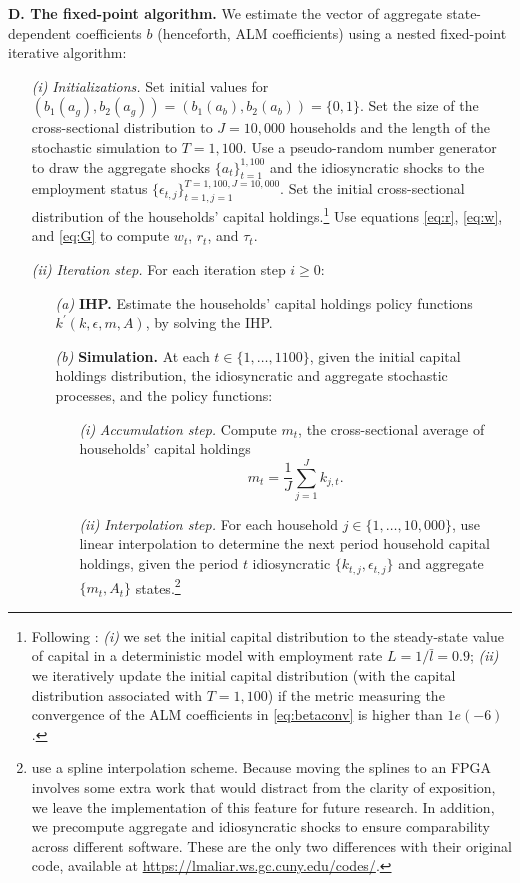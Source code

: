 \documentclass[12pt,american]{article}
\newcommand{\kopt}{k^{\prime}}
\newcommand{\lbar}{\bar{l}}
\newcommand{\state}{k,\epsilon,m,A}
\begin{document}
\textbf{D. The fixed-point algorithm.} We estimate the vector of aggregate state-dependent coefficients $b$ (henceforth, ALM coefficients) using a nested fixed-point iterative algorithm:
\begin{itemize}
\item [\textit{(i)}] \textit{Initializations.} Set initial values for $(b_1(a_g),b_{2}(a_g))=(b_1(a_b),b_{2}(a_b))=\{0,1\}$. Set the size of the cross-sectional distribution to $J=10,000$ households and the length of the stochastic simulation to $T=1,100$. Use a pseudo-random number generator to draw the aggregate shocks $\{a_t\}_{t=1}^{1,100}$ and the idiosyncratic shocks to the employment status $\{\epsilon_{t,j}\}_{t=1,j=1}^{T=1,100,J=10,000}$. Set the initial cross-sectional distribution of the households' capital holdings.\footnote{Following \citet{MaliarMaliarValli2010}: \textit{(i)} we set the initial capital distribution to the steady-state value of capital in a deterministic model with employment rate $L =1/\lbar=0.9$; \textit{(ii)} we iteratively update the initial capital distribution (with the capital distribution associated with $T=1,100$) if the metric measuring the convergence of the ALM coefficients in \eqref{eq:betaconv} is higher than $1e(-6)$.} Use equations \eqref{eq:r}, \eqref{eq:w}, and \eqref{eq:G} to compute $w_t$, $r_t$, and $\tau_t$.

\item [\textit{(ii)}] \textit{Iteration step.} For each iteration step $i\geq 0$:
\begin{itemize}
\item [\textit{(a)}] \textbf{IHP.} Estimate the households' capital holdings policy functions $\kopt(\state)$, by solving the IHP.
\item [\textit{(b)}] \textbf{Simulation.} At each $t\in\{1,\ldots,1100\}$, given the initial capital holdings distribution, the idiosyncratic and aggregate stochastic processes, and the policy functions:
\begin{itemize}
\item [\textit{(i)}] \textit{Accumulation step.} Compute $m_t$, the cross-sectional average of households' capital holdings 
\begin{equation}\label{eq:Kagg}
m_{t} = \frac{1}{J}\sum_{j=1}^{J}k_{j,t}.
\end{equation}
\item [\textit{(ii)}] \textit{Interpolation step.} For each household $j\in\{1,\ldots,10,000\}$, use linear interpolation to determine the next period household capital holdings, given the period $t$ idiosyncratic $\{k_{t,j},\epsilon_{t,j}\}$ and aggregate $\{m_t,A_t\}$ states.\footnote{\citet{MaliarMaliarValli2010} use a spline interpolation scheme. Because moving the splines to an FPGA involves some extra work that would distract from the clarity of exposition, we leave the implementation of this feature for future research. In addition, we precompute aggregate and idiosyncratic shocks to ensure comparability across different software. These are the only two differences with their original code, available at \url{https://lmaliar.ws.gc.cuny.edu/codes/}.} 
\end{itemize}


\end{itemize}
\end{itemize}
\end{document}
